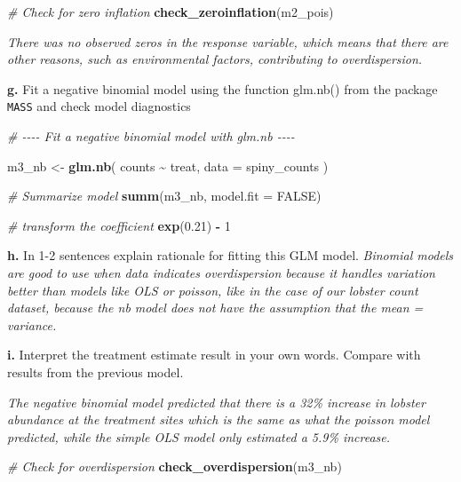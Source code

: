 \documentclass[
]{article}
\newenvironment{Shaded}{\begin{snugshade}}{\end{snugshade}}
\newcommand{\AttributeTok}[1]{\textcolor[rgb]{0.13,0.29,0.53}{#1}}
\newcommand{\CommentTok}[1]{\textcolor[rgb]{0.56,0.35,0.01}{\textit{#1}}}
\newcommand{\ConstantTok}[1]{\textcolor[rgb]{0.56,0.35,0.01}{#1}}
\newcommand{\DecValTok}[1]{\textcolor[rgb]{0.00,0.00,0.81}{#1}}
\newcommand{\FloatTok}[1]{\textcolor[rgb]{0.00,0.00,0.81}{#1}}
\newcommand{\FunctionTok}[1]{\textcolor[rgb]{0.13,0.29,0.53}{\textbf{#1}}}
\newcommand{\NormalTok}[1]{#1}
\newcommand{\OtherTok}[1]{\textcolor[rgb]{0.56,0.35,0.01}{#1}}
\newcommand{\SpecialCharTok}[1]{\textcolor[rgb]{0.81,0.36,0.00}{\textbf{#1}}}
\begin{document}
\begin{Shaded}
\begin{Highlighting}[]
\CommentTok{\# Check for zero inflation}
\FunctionTok{check\_zeroinflation}\NormalTok{(m2\_pois)}
\end{Highlighting}
\end{Shaded}

\emph{There was no observed zeros in the response variable, which means
that there are other reasons, such as environmental factors,
contributing to overdispersion.}

\textbf{g.} Fit a negative binomial model using the function glm.nb()
from the package \texttt{MASS} and check model diagnostics

\begin{Shaded}
\begin{Highlighting}[]
\CommentTok{\# {-}{-}{-}{-} Fit a negative binomial model with glm.nb {-}{-}{-}{-}}

\NormalTok{m3\_nb }\OtherTok{\textless{}{-}} \FunctionTok{glm.nb}\NormalTok{(}
\NormalTok{    counts }\SpecialCharTok{\textasciitilde{}}\NormalTok{ treat,}
    \AttributeTok{data =}\NormalTok{ spiny\_counts}
\NormalTok{)}

\CommentTok{\# Summarize model}
\FunctionTok{summ}\NormalTok{(m3\_nb, }\AttributeTok{model.fit =} \ConstantTok{FALSE}\NormalTok{)}

\CommentTok{\# transform the coefficient}
\FunctionTok{exp}\NormalTok{(}\FloatTok{0.21}\NormalTok{) }\SpecialCharTok{{-}} \DecValTok{1}
\end{Highlighting}
\end{Shaded}

\textbf{h.} In 1-2 sentences explain rationale for fitting this GLM
model. \emph{Binomial models are good to use when data indicates
overdispersion because it handles variation better than models like OLS
or poisson, like in the case of our lobster count dataset, because the
nb model does not have the assumption that the mean = variance.}

\textbf{i.} Interpret the treatment estimate result in your own words.
Compare with results from the previous model.

\emph{The negative binomial model predicted that there is a 32\%
increase in lobster abundance at the treatment sites which is the same
as what the poisson model predicted, while the simple OLS model only
estimated a 5.9\% increase.}

\begin{Shaded}
\begin{Highlighting}[]
\CommentTok{\# Check for overdispersion}
\FunctionTok{check\_overdispersion}\NormalTok{(m3\_nb)}
\end{Highlighting}
\end{Shaded}
\end{document}
